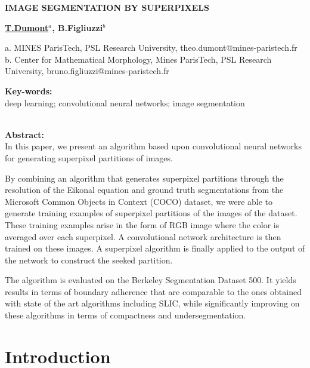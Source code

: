 \documentclass{article}
\begin{document}
\begin{center}
    \begin{Large}\textbf{IMAGE SEGMENTATION BY SUPERPIXELS}\end{Large}

    \vspace{1cm}
    \begin{large}\textbf{\underline{T.Dumont$^a$}, B.Figliuzzi$^b$}\end{large}

    \vspace{0.5cm}
    a. MINES ParisTech, PSL Research University, theo.dumont@mines-paristech.fr\\
    b. Center for Mathematical Morphology, Mines ParisTech, PSL Research University, bruno.figliuzzi@mines-paristech.fr
    \vspace{1cm}
\end{center}

\begin{center}

\noindent\textbf{Key-words: }\\
deep learning; convolutional neural networks; image segmentation\\
\ \\
\end{center}
\textbf{Abstract: }\\
In this paper, we present an algorithm based upon convolutional neural networks for generating superpixel partitions of images.
\par
By combining an algorithm that generates superpixel partitions through the resolution of the Eikonal equation and ground truth segmentations from the Microsoft Common Objects in Context (COCO) dataset, we were able to generate training examples of superpixel partitions of the images of the dataset. These training examples arise in the form of RGB image where the color is averaged over each superpixel. A convolutional network architecture is then trained on these images. A superpixel algorithm is finally applied to the output of the network to construct the seeked partition.
\par
The algorithm is evaluated on the Berkeley Segmentation Dataset 500. It yields results in terms of boundary adherence that are comparable to the ones obtained with state of the art algorithms including SLIC, while significantly improving on these algorithms in terms of compactness and undersegmentation.


\section{Introduction}
\end{document}
